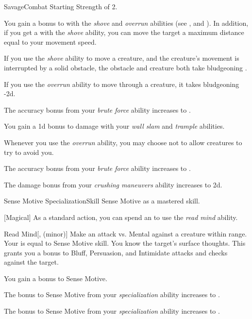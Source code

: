     \begin{feat}{Savage}{Combat}
        \featpre Starting Strength of 2.

         You gain a  bonus to  with the \textit{shove} and \textit{overrun} abilities (see , and ).
        In addition, if you get a  with the \textit{shove} ability, you can move the target a maximum distance equal to your movement speed.

         If you use the \textit{shove} ability to move a creature, and the creature's movement is interrupted by a solid obstacle, the obstacle and creature both take bludgeoning .

         If you use the \textit{overrun} ability to move through a creature, it takes bludgeoning  -2d.

         The accuracy bonus from your \textit{brute force} ability increases to .

         You gain a \plus1d bonus to damage with your \textit{wall slam} and \textit{trample} abilities.

         Whenever you use the \textit{overrun} ability, you may choose not to allow creatures to try to avoid you.

         The accuracy bonus from your \textit{brute force} ability increases to .

         The damage bonus from your \textit{crushing maneuvers} ability increases to \plus2d. 
    \end{feat}

    \begin{feat}{Sense Motive Specialization}{Skill}
        \featpre Sense Motive as a mastered skill.

        [Magical] As a standard action, you can spend an  to use the \textit{read mind} ability.
        \begin{ability}{Read Mind}[,  (minor)]
            Make an attack vs. Mental against a creature within \rngclose range.
            Your  is equal to Sense Motive skill.
            \hit You know the target's surface thoughts.
            This grants you a  bonus to Bluff, Persuasion, and Intimidate attacks and checks against the target.
        \end{ability}

         You gain a  bonus to Sense Motive.

         The bonus to Sense Motive from your \textit{specialization} ability increases to .

         The bonus to Sense Motive from your \textit{specialization} ability increases to .
    \end{feat}

